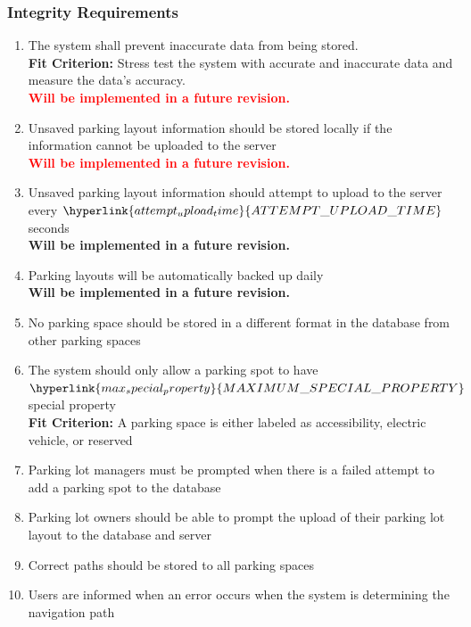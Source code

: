 \documentclass[12pt,letterpaper]{article}
\begin{document}
\subsubsection{Integrity Requirements}
\begin{enumerate}[resume*] 
    \item The system shall prevent inaccurate data from being stored.\\
    \textbf{Fit Criterion:} Stress test the system with accurate and inaccurate
    data and measure the data's accuracy.\\
    \textbf{\textcolor{red}{Will be implemented in a future revision.}}
    \item Unsaved parking layout information should be stored locally if the
    information cannot be uploaded to the server \label{isr5}\\
    \textbf{\textcolor{red}{Will be implemented in a future revision.}}
    \item{\color{red} Unsaved parking layout information should attempt to
    upload to the server every
    $\hyperlink{attempt_upload_time}{ATTEMPT\_UPLOAD\_TIME}$ seconds
    \label{isr6}\\
    \textbf{Will be implemented in a future revision.}}
    \item{\color{red}Parking layouts will be automatically backed up daily
    \label{isr7}\\
    \textbf{Will be implemented in a future revision.}}
    \item No parking space should be stored in a different format in the
    database from other parking spaces \label{isr8}
    \item The system should only allow a parking spot to have
    $\hyperlink{max_special_property}{MAXIMUM\_SPECIAL\_PROPERTY}$ special
    property \label{isr9}\\
    \textbf{Fit Criterion:} A parking space is either labeled as accessibility,
    electric vehicle, or reserved
    \item Parking lot managers must be prompted when there is a failed attempt
    to add a parking spot to the database \label{isr10}
    \item Parking lot owners should be able to prompt the upload of their
    parking lot layout to the database and server \label{isr11}
    \item Correct paths should be stored to all parking spaces \label{isr12}
    \item Users are informed when an error occurs when the system is determining
    the navigation path \label{isr13}
\end{enumerate}
\end{document}
